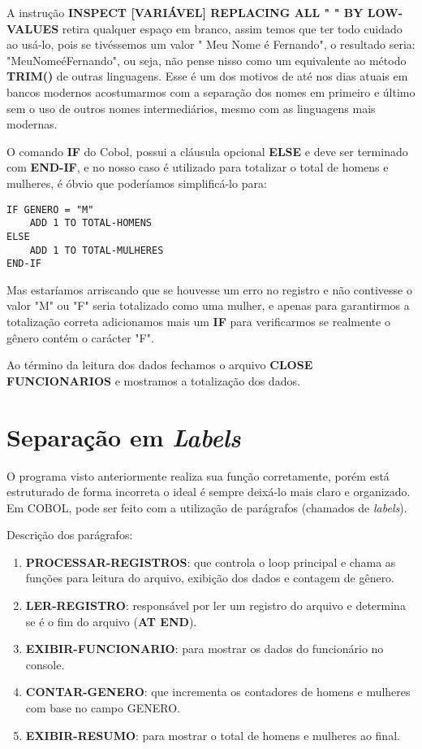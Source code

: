 A instrução \textbf{INSPECT [VARIÁVEL] REPLACING ALL " " BY LOW-VALUES} retira qualquer espaço em branco, assim temos que ter todo cuidado ao usá-lo, pois se tivéssemos um valor "  Meu Nome é Fernando", o resultado seria: "MeuNomeéFernando", ou seja, não pense nisso como um equivalente ao método \textbf{TRIM()} de outras linguagens. Esse é um dos motivos de até nos dias atuais em bancos modernos acostumarmos com a separação dos nomes em primeiro e último sem o uso de outros nomes intermediários, mesmo com as linguagens mais modernas.

O comando \textbf{IF} do Cobol, possui a cláusula opcional \textbf{ELSE} e deve ser terminado com \textbf{END-IF}, e no nosso caso é utilizado para totalizar o total de homens e mulheres, é óbvio que poderíamos simplificá-lo para:
\begin{lstlisting}[]
IF GENERO = "M"
    ADD 1 TO TOTAL-HOMENS
ELSE
    ADD 1 TO TOTAL-MULHERES
END-IF
\end{lstlisting}

Mas estaríamos arriscando que se houvesse um erro no registro e não contivesse o valor "M" ou "F" seria totalizado como uma mulher, e apenas para garantirmos a totalização correta adicionamos mais um \textbf{IF} para verificarmos se realmente o gênero contém o carácter "F".

Ao término da leitura dos dados fechamos o arquivo \textbf{CLOSE FUNCIONARIOS} e mostramos a totalização dos dados.

\section{Separação em \textit{Labels}}
O programa visto anteriormente realiza sua função corretamente, porém está estruturado de forma incorreta o ideal é sempre deixá-lo mais claro e organizado. Em COBOL, pode ser feito com a utilização de parágrafos (chamados de \textit{labels}).

Descrição dos parágrafos:
\begin{enumerate}
	\item \textbf{PROCESSAR-REGISTROS}: que controla o loop principal e chama as funções para leitura do arquivo, exibição dos dados e contagem de gênero.
	\item \textbf{LER-REGISTRO}: responsável por ler um registro do arquivo e determina se é o fim do arquivo (\textbf{AT END}).
	\item \textbf{EXIBIR-FUNCIONARIO}: para mostrar os dados do funcionário no console.
	\item \textbf{CONTAR-GENERO}: que incrementa os contadores de homens e mulheres com base no campo GENERO.
	\item \textbf{EXIBIR-RESUMO}: para mostrar o total de homens e mulheres ao final.
\end{enumerate}

